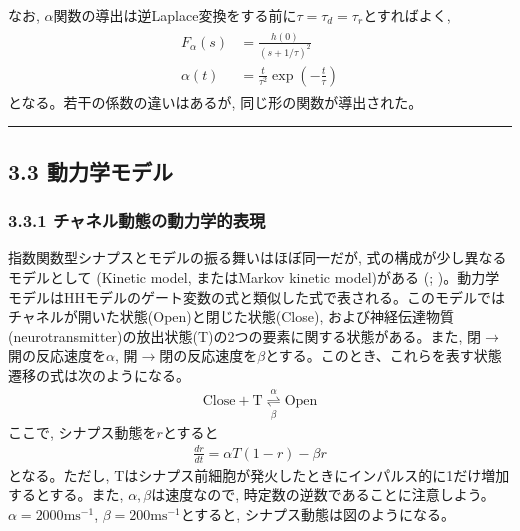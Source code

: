 \documentclass[letterpaper,10pt,english]{sphinxmanual}
\begin{document}
なお, \(\alpha\)関数の導出は逆Laplace変換をする前に\(\tau=\tau_d=\tau_r\)とすればよく,
\begin{equation*}
\begin{split}
\begin{align}
F_\alpha(s)&=\frac{h(0)}{(s+1/\tau)^2}\\
\alpha(t)&=\frac{t}{\tau^2}\exp\left(-\frac{t}{\tau}\right)
\end{align}
\end{split}
\end{equation*}
となる。若干の係数の違いはあるが, 同じ形の関数が導出された。


\bigskip\hrule\bigskip



\subsection{3.3 動力学モデル}
\label{\detokenize{3-4_kinetic-synapse:id1}}\label{\detokenize{3-4_kinetic-synapse::doc}}

\subsubsection{3.3.1 チャネル動態の動力学的表現}
\label{\detokenize{3-4_kinetic-synapse:id2}}
指数関数型シナプスとモデルの振る舞いはほぼ同一だが, 式の構成が少し異なるモデルとして (Kinetic model, またはMarkov kinetic model)がある (; )。動力学モデルはHHモデルのゲート変数の式と類似した式で表される。このモデルではチャネルが開いた状態(Open)と閉じた状態(Close), および神経伝達物質(neurotransmitter)の放出状態(T)の2つの要素に関する状態がある。また, 閉\(\to\)開の反応速度を\(\alpha\), 開\(\to\)閉の反応速度を\(\beta\)とする。このとき、これらを表す状態遷移の式は次のようになる。
\begin{equation*}
\begin{split}
\begin{equation}
\text{Close}+\text{T}  \underset{\beta}{\overset{\alpha}{\rightleftharpoons}}\text{Open}    
\end{equation}
\end{split}
\end{equation*}
ここで, シナプス動態を\(r\)とすると
\begin{equation*}
\begin{split}
\begin{equation}
\frac{dr}{dt}=\alpha T (1-r) - \beta r
\end{equation}
\end{split}
\end{equation*}
となる。ただし, Tはシナプス前細胞が発火したときにインパルス的に1だけ増加するとする。また, \(\alpha, \beta\)は速度なので, 時定数の逆数であることに注意しよう。 \(\alpha=2000 \text{ms}^{-1}\), \(\beta=200 \text{ms}^{-1}\)とすると, シナプス動態は図のようになる。
\end{document}

